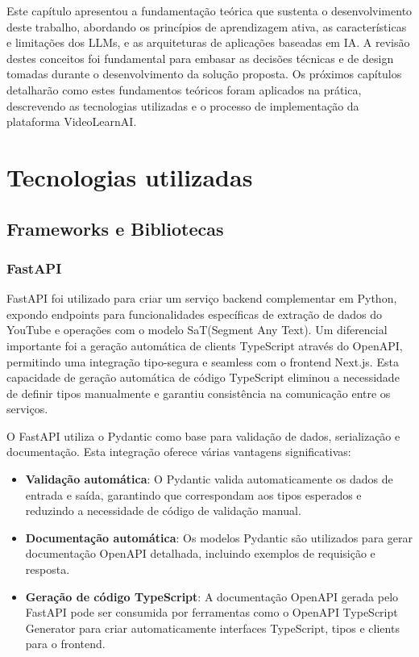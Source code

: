 \documentclass[tcc,capa]{texufpel}
\begin{document}
Este capítulo apresentou a fundamentação teórica que sustenta o desenvolvimento deste trabalho, abordando os princípios de aprendizagem ativa, as características e limitações dos LLMs, e as arquiteturas de aplicações baseadas em IA. A revisão destes conceitos foi fundamental para embasar as decisões técnicas e de design tomadas durante o desenvolvimento da solução proposta. Os próximos capítulos detalharão como estes fundamentos teóricos foram aplicados na prática, descrevendo as tecnologias utilizadas e o processo de implementação da plataforma VideoLearnAI.


\chapter{Tecnologias utilizadas}

\section{Frameworks e Bibliotecas}

\subsection{FastAPI}
FastAPI foi utilizado para criar um serviço backend complementar em Python, expondo endpoints para funcionalidades específicas de extração de dados do YouTube e operações com o modelo SaT(Segment Any Text). Um diferencial importante foi a geração automática de clients TypeScript através do OpenAPI, permitindo uma integração tipo-segura e seamless com o frontend Next.js. Esta capacidade de geração automática de código TypeScript eliminou a necessidade de definir tipos manualmente e garantiu consistência na comunicação entre os serviços.

O FastAPI utiliza o Pydantic como base para validação de dados, serialização e documentação. Esta integração oferece várias vantagens significativas:

\begin{itemize}
    \item \textbf{Validação automática}: O Pydantic valida automaticamente os dados de entrada e saída, garantindo que correspondam aos tipos esperados e reduzindo a necessidade de código de validação manual.
    
    \item \textbf{Documentação automática}: Os modelos Pydantic são utilizados para gerar documentação OpenAPI detalhada, incluindo exemplos de requisição e resposta.
    
    \item \textbf{Geração de código TypeScript}: A documentação OpenAPI gerada pelo FastAPI pode ser consumida por ferramentas como o OpenAPI TypeScript Generator para criar automaticamente interfaces TypeScript, tipos e clients para o frontend.
\end{itemize}
\end{document}
